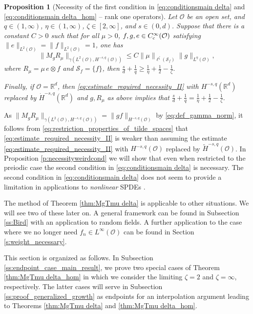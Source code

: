 \documentclass[reqno]{amsart}
\theoremstyle{plain}
\theoremstyle{remark}
\theoremstyle{plain}
\newtheorem{proposition}[theorem]{Proposition}
\numberwithin{equation}{section}
\newcommand\cO{\mathcal{O}}
\def\R{{\mathbb R}}
\newcommand{\Domm}{\mathcal{O}}
\newcommand{\wt}{\widetilde}
\newcommand{\1}{\one}
\renewcommand{\S}{\mathcal{S}}
\newcommand{\Sf}{\mathcal{S}_{f}}
\begin{document}
\begin{proposition}[Necessity of the first condition in \eqref{eq:conditionsmain delta} and \eqref{eq:conditionsmain delta_hom} -- rank one operators]
\label{p:necessityLinfty_hom}
Let $\Domm$ be an open set, and 
$q\in (1, \infty)$, $\eta\in (1, \infty)$, $\zeta\in [2, \infty]$, and $s\in(0,d)$.
Suppose that there is a constant $C>0$ such that for all $\mu> 0$, $f,g,e\in C^\infty_{{\rm c}}(\Domm)$ satisfying $\|e\|_{L^2(\Domm)}=\|f\|_{L^2(\Domm)}=1$, one has
\begin{equation}
\label{eq:estimate_required_necessity_II}
\|M_g R_\mu \|_{\gamma(L^2(\Domm),H^{-s,q}(\Domm))}\leq C \|\mu\|_{\ell^{\zeta}(\Sf)} \|g\|_{L^{\eta}(\Domm)},
\end{equation}
where $R_\mu= \mu\, e\otimes f$ and $\S_f =\{f\}$, then 
$
\frac{s}{d} + \frac{1}{q}  \geq \frac{1}{\eta} + \frac{1}{2} - \frac{1}{\zeta}.
$

Finally, if $\Domm=\R^d$, then \eqref{eq:estimate_required_necessity_II} with $H^{-s,q}(\R^d)$ replaced by $\dot{H}^{-s,q}(\R^d)$ and $g,R_\mu$ as above implies that
$
\frac{s}{d} + \frac{1}{q}  = \frac{1}{\eta} + \frac{1}{2} - \frac{1}{\zeta}.
$
\end{proposition}

As $\|M_g R_\mu\|_{\gamma(L^2(\Domm),H^{-s,q}(\Domm))}=\|g f\|_{H^{-s,q}(\cO)}$ by \eqref{eq:def_gamma_norm}, it follows from \eqref{eq:restriction_properties_of_tilde_spaces} that \eqref{eq:estimate_required_necessity_II} is weaker than assuming the estimate \eqref{eq:estimate_required_necessity_II} with $H^{-s,q}(\cO)$ replaced by $\wt{H}^{-s,q}(\cO)$.
%
In Proposition \ref{p:necessityweirdcond} we will show that even when restricted to the preiodic case the second condition in \eqref{eq:conditionsmain delta} is necessary.
The second condition in \eqref{eq:conditionsmain delta} does not seem to provide a limitation in applications to \emph{nonlinear} SPDEs \cite{AGVlocal}.

\smallskip

The method of Theorem \ref{thm:MgTmu delta} is applicable to other  situations. We will see two of these later on. A general framework can be found in Subsection \ref{ss:Bird} with an application to random fields. A further application to the case where we no longer need $f_n\in L^\infty(\cO)$ can be found in Section \ref{s:weight_necessary}. 




\smallskip

This section is organized as follows. In Subsection \ref{ss:endpoint_case_main_result}, we prove two special cases of Theorem \ref{thm:MgTmu delta_hom} in which we consider the limiting $\zeta=2$ and $\zeta=\infty$, respectively. The latter cases will serve in Subsection \ref{ss:proof_generalized_growth} as endpoints for an interpolation argument leading to Theorems \ref{thm:MgTmu delta} and \ref{thm:MgTmu delta_hom}. 
\end{document}
